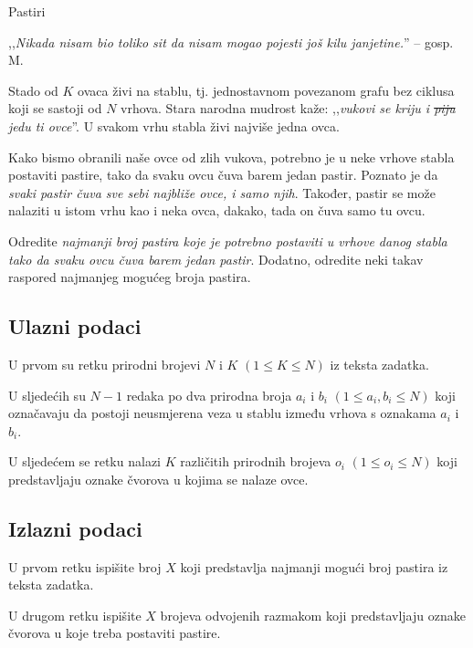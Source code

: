 \begin{statement}[
  problempoints=100,
  timelimit=1 sekunda,
  memorylimit=512 MiB,
]{Pastiri}

,,\textit{Nikada nisam bio toliko sit da nisam mogao pojesti još kilu janjetine.}''
  -- gosp. M.

Stado od $K$ ovaca živi na stablu, tj. jednostavnom povezanom grafu bez ciklusa
koji se sastoji od $N$ vrhova. Stara narodna mudrost kaže: ,,\textit{vukovi
se kriju i \sout{piju} jedu ti ovce}''. U svakom vrhu stabla živi najviše jedna ovca.

Kako bismo obranili naše ovce od zlih
vukova, potrebno je u neke vrhove stabla postaviti pastire, tako da svaku
ovcu čuva barem jedan pastir. Poznato je da \emph{svaki pastir čuva sve
sebi najbliže ovce, i samo njih}. Također, pastir se može nalaziti u istom vrhu
kao i neka ovca, dakako, tada on čuva samo tu ovcu.

Odredite \emph{najmanji broj pastira koje je potrebno postaviti u vrhove danog
stabla tako da svaku ovcu čuva barem jedan pastir}. Dodatno, odredite neki takav
raspored najmanjeg mogućeg broja pastira.

\subsection*{Ulazni podaci}
U prvom su retku prirodni brojevi $N$ i $K$ $(1 \le K \le N)$ iz teksta zadatka.

U sljedećih su $N-1$ redaka po dva prirodna broja $a_i$ i $b_i$ $(1 \le a_i, b_i \le N)$ koji
označavaju da postoji neusmjerena veza u stablu između vrhova s oznakama $a_i$ i $b_i$.

U sljedećem se retku nalazi $K$ različitih prirodnih brojeva $o_i$ $(1 \le o_i \le N)$ koji
predstavljaju oznake čvorova u kojima se nalaze ovce.

\subsection*{Izlazni podaci}
U prvom retku ispišite broj $X$ koji predstavlja najmanji mogući broj pastira
iz teksta zadatka.

U drugom retku ispišite $X$ brojeva odvojenih razmakom koji predstavljaju oznake
čvorova u koje treba postaviti pastire.


\end{statement}
